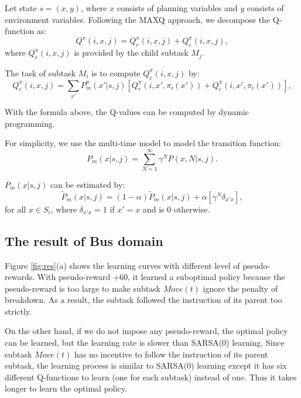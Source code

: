 Let state $s = (x, y)$, where $x$ consists of planning variables and $y$ consists of environment
variables. Following the MAXQ approach, we decompose the Q-function as:
\begin{equation}
    Q^{\pi}(i, x, j) = Q_r^{\pi}(i, x, j) + Q_c^{\pi}(i, x, j),
    \label{eq:biasedMaxQ}
\end{equation}
where $Q_r^{\pi}(i, x, j)$ is provided by the child subtask $M_j$.

The task of subtask $M_i$ is to compute $Q_c^{\pi}(i, x, j)$ by:
\begin{equation}
    Q_c^{\pi}(i, x, j) = \sum_{x'} P_m^{\pi}(x'|s, j)[Q_r^{\pi}(i, x', \pi_i(x')) + Q_c^{\pi}(i, x', \pi_i(x'))],
    \label{eq:biasedQc}
\end{equation}

With the formula above, the Q-values can be computed by dynamic programming.

For simplicity, we use the multi-time model \cite{SMDP} to model the transition function: 
\begin{equation}
    P_m(x|s, j) = \sum^{\infty}_{N=1} \gamma^N P(x, N|s, j).
    \label{eq:multiProb}
\end{equation}

$P_m(x|s, j)$ can be estimated by:
\begin{equation}
    \tilde{P}_m(x|s, j) = (1-\alpha)\tilde{P}_m(x|s, j) + \alpha [ \gamma^N \delta_{x'x}],
    \label{eq:approxP}
\end{equation}
for all $x \in S_i$, where $\delta_{x'x}=1$ if $x' = x$ and is 0 otherwise.

\subsection{The result of Bus domain}
\label{se:BusRes}
Figure \ref{fig:res}(a) shows the learning curves with different level of pseudo-rewards.
With pseudo-reward +60, it learned a suboptimal policy because
the pseudo-reward is too large to make subtask $Move(t)$ ignore 
the penalty of breakdown. As a result, the subtask followed 
the instruction of its parent too strictly.

On the other hand, if we do not impose any pseudo-reward, 
the optimal policy can be learned, but the learning rate is
slower than SARSA(0) learning. Since subtask $Move(t)$ has no
incentive to follow the instruction of its parent subtask, 
the learning process is similar to SARSA(0) learning 
except it has six different Q-functions to learn (one for each subtask) instead of one.
Thus it takes longer to learn the optimal policy. 

